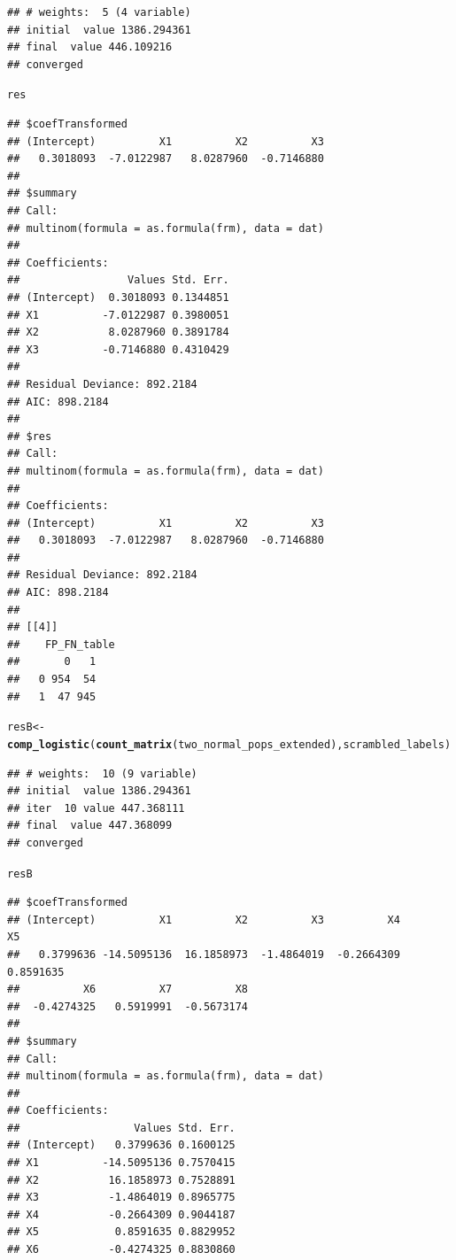 \documentclass{article}\usepackage[]{graphicx}\usepackage[]{color}
\makeatletter
\newcommand{\hlstd}[1]{\textcolor[rgb]{0.345,0.345,0.345}{#1}}%
\newcommand{\hlkwb}[1]{\textcolor[rgb]{0.69,0.353,0.396}{#1}}%
\newcommand{\hlkwd}[1]{\textcolor[rgb]{0.737,0.353,0.396}{\textbf{#1}}}%
\newenvironment{kframe}{%
 \def\at@end@of@kframe{}%
 \ifinner\ifhmode%
  \def\at@end@of@kframe{\end{minipage}}%
  \begin{minipage}{\columnwidth}%
 \fi\fi%
 \def\FrameCommand##1{\hskip\@totalleftmargin \hskip-\fboxsep
 \colorbox{shadecolor}{##1}\hskip-\fboxsep
     \hskip-\linewidth \hskip-\@totalleftmargin \hskip\columnwidth}%
 \MakeFramed {\advance\hsize-\width
   \@totalleftmargin\z@ \linewidth\hsize
   \@setminipage}}%
 {\par\unskip\endMakeFramed%
 \at@end@of@kframe}
\newenvironment{knitrout}{}{} %
\makeatother
\begin{document}
\begin{knitrout}
\begin{kframe}
{\ttfamily\noindent\itshape\color{messagecolor}{\#\# Loading required package: nnet}}\begin{verbatim}
## # weights:  5 (4 variable)
## initial  value 1386.294361 
## final  value 446.109216 
## converged
\end{verbatim}
\begin{alltt}
\hlstd{res}
\end{alltt}
\begin{verbatim}
## $coefTransformed
## (Intercept)          X1          X2          X3 
##   0.3018093  -7.0122987   8.0287960  -0.7146880 
## 
## $summary
## Call:
## multinom(formula = as.formula(frm), data = dat)
## 
## Coefficients:
##                 Values Std. Err.
## (Intercept)  0.3018093 0.1344851
## X1          -7.0122987 0.3980051
## X2           8.0287960 0.3891784
## X3          -0.7146880 0.4310429
## 
## Residual Deviance: 892.2184 
## AIC: 898.2184 
## 
## $res
## Call:
## multinom(formula = as.formula(frm), data = dat)
## 
## Coefficients:
## (Intercept)          X1          X2          X3 
##   0.3018093  -7.0122987   8.0287960  -0.7146880 
## 
## Residual Deviance: 892.2184 
## AIC: 898.2184 
## 
## [[4]]
##    FP_FN_table
##       0   1
##   0 954  54
##   1  47 945
\end{verbatim}
\begin{alltt}
\hlstd{resB} \hlkwb{<-} \hlkwd{comp_logistic}\hlstd{(}\hlkwd{count_matrix}\hlstd{(two_normal_pops_extended), scrambled_labels)}
\end{alltt}
\begin{verbatim}
## # weights:  10 (9 variable)
## initial  value 1386.294361 
## iter  10 value 447.368111
## final  value 447.368099 
## converged
\end{verbatim}
\begin{alltt}
\hlstd{resB}
\end{alltt}
\begin{verbatim}
## $coefTransformed
## (Intercept)          X1          X2          X3          X4          X5 
##   0.3799636 -14.5095136  16.1858973  -1.4864019  -0.2664309   0.8591635 
##          X6          X7          X8 
##  -0.4274325   0.5919991  -0.5673174 
## 
## $summary
## Call:
## multinom(formula = as.formula(frm), data = dat)
## 
## Coefficients:
##                  Values Std. Err.
## (Intercept)   0.3799636 0.1600125
## X1          -14.5095136 0.7570415
## X2           16.1858973 0.7528891
## X3           -1.4864019 0.8965775
## X4           -0.2664309 0.9044187
## X5            0.8591635 0.8829952
## X6           -0.4274325 0.8830860

\end{verbatim}
\end{kframe}
\end{knitrout}
\end{document}
